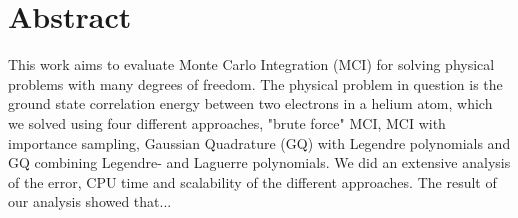 \section*{Abstract}
This work aims to evaluate Monte Carlo Integration (MCI) for solving physical
problems with many degrees of freedom. The physical problem in question is
the ground state correlation energy between two electrons in a helium atom,
which we solved using four different approaches, "brute force" MCI, MCI with
importance sampling, Gaussian Quadrature (GQ) with Legendre polynomials and GQ
combining Legendre- and Laguerre polynomials. We did an extensive analysis of the error,
CPU time and scalability of the different approaches. The result of our
analysis showed that... 
